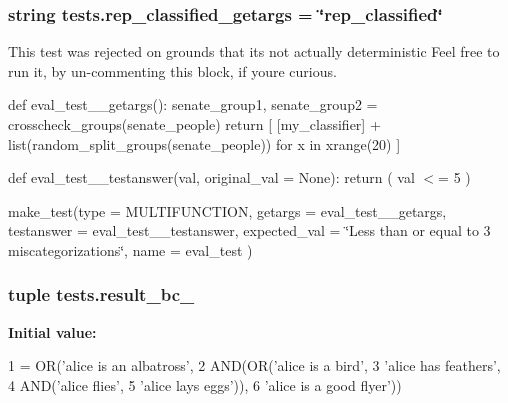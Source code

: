 \subsubsection[{rep\+\_\+classified\+\_\+getargs}]{\setlength{\rightskip}{0pt plus 5cm}string tests.\+rep\+\_\+classified\+\_\+getargs = \char`\"{}rep\+\_\+classified\char`\"{}}\label{namespacetests_a0245f1ca98b1be40726e6fdd05e82d1a}


This test was rejected on grounds that it\textquotesingle{}s not actually deterministic Feel free to run it, by un-\/commenting this block, if you\textquotesingle{}re curious. 

def eval\+\_\+test\+\_\+\_\+getargs()\+: senate\+\_\+group1, senate\+\_\+group2 = crosscheck\+\_\+groups(senate\+\_\+people) return \mbox{[} \mbox{[}\textquotesingle{}my\+\_\+classifier\textquotesingle{}\mbox{]} + list(random\+\_\+split\+\_\+groups(senate\+\_\+people)) for x in xrange(20) \mbox{]}

def eval\+\_\+test\+\_\+\_\+testanswer(val, original\+\_\+val = None)\+: return ( val $<$= 5 )

make\+\_\+test(type = \textquotesingle{}M\+U\+L\+T\+I\+F\+U\+N\+C\+T\+I\+O\+N\textquotesingle{}, getargs = eval\+\_\+test\+\_\+\_\+getargs, testanswer = eval\+\_\+test\+\_\+\_\+testanswer, expected\+\_\+val = \char`\"{}\+Less than or equal to 3 miscategorizations\char`\"{}, name = \textquotesingle{}eval\+\_\+test\textquotesingle{} ) \hypertarget{namespacetests_abf2e7e3c18ce87b2d297bfafb30f9c34}{}
\subsubsection[{result\+\_\+bc\+\_\+2}]{\setlength{\rightskip}{0pt plus 5cm}tuple tests.\+result\+\_\+bc\+\_}\label{namespacetests_abf2e7e3c18ce87b2d297bfafb30f9c34}
{\bfseries Initial value\+:}
\begin{DoxyCode}
1 = OR(\textcolor{stringliteral}{'alice is an albatross'},
2                  AND(OR(\textcolor{stringliteral}{'alice is a bird'},
3                         \textcolor{stringliteral}{'alice has feathers'},
4                         AND(\textcolor{stringliteral}{'alice flies'},
5                             \textcolor{stringliteral}{'alice lays eggs'})),
6                      \textcolor{stringliteral}{'alice is a good flyer'}))
\end{DoxyCode}
\hypertarget{namespacetests_ad1264ea8fc62114c2cce09081940562d}{}
